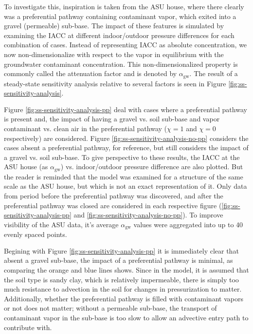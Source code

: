 \documentclass[journal=esthag,manuscript=article]{achemso}
\begin{document}
To investigate this, inspiration is taken from the ASU house, where there clearly was a preferential pathway containing contaminant vapor, which exited into a gravel (permeable) sub-base.
The impact of these features is simulated by examining the IACC at different indoor/outdoor pressure differences for each combination of cases.
Instead of representing IACC as absolute concentration, we now non-dimensionalize with respect to the vapor in equilibrium with the groundwater contaminant concentration.
This non-dimensionalized property is commonly called the attenuation factor and is denoted by $\alpha_\mathrm{gw}$.
The result of a steady-state sensitivity analysis relative to several factors is seen in Figure \ref{fig:ss-sensitivity-analysis}.\par

Figure \ref{fig:ss-sensitivity-analysis-pp} deal with cases where a preferential pathway is present and, the impact of having a gravel vs. soil sub-base and vapor contaminant vs. clean air in the preferential pathway ($\chi=1$ and $\chi=0$ respectively) are considered.
Figure \ref{fig:ss-sensitivity-analysis-no-pp} considers the cases absent a preferential pathway, for reference, but still considers the impact of a gravel vs. soil sub-base.
To give perspective to these results, the IACC at the ASU house (as $\alpha_\mathrm{gw}$) vs. indoor/outdoor pressure difference are also plotted.
But the reader is reminded that the model was examined for a structure of the same scale as the ASU house, but which is not an exact representation of it.
Only data from period before the preferential pathway was discovered, and after the preferential pathway was closed are considered in each respective figure (\ref{fig:ss-sensitivity-analysis-pp} and \ref{fig:ss-sensitivity-analysis-no-pp}).
To improve visibility of the ASU data, it's average $\alpha_\mathrm{gw}$ values were aggregated into up to 40 evenly spaced points.\par

Begining with Figure \ref{fig:ss-sensitivity-analysis-pp} it is immediately clear that absent a gravel sub-base, the impact of a preferential pathway is minimal, as comparing the orange and blue lines shows.
Since in the model, it is assumed that the soil type is sandy clay, which is relatively impermeable, there is simply too much resistance to advection in the soil for changes in pressurization to matter.
Additionally, whether the preferential pathway is filled with contaminant vapors or not does not matter; without a permeable sub-base, the transport of contaminant vapor in the sub-base is too slow to allow an advective entry path to contribute with.\par
\end{document}
